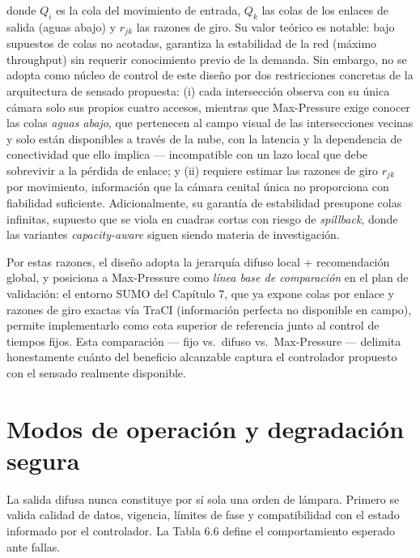 \documentclass[12pt,a4paper,oneside]{report}
\begin{document}
donde \(Q_{i}\) es la cola del movimiento de entrada, \(Q_{k}\) las colas de los enlaces de salida (aguas abajo) y \(r_{jk}\) las razones de giro. Su valor teórico es notable: bajo supuestos de colas no acotadas, garantiza la estabilidad de la red (máximo throughput) sin requerir conocimiento previo de la demanda. Sin embargo, no se adopta como núcleo de control de este diseño por dos restricciones concretas de la arquitectura de sensado propuesta: (i) cada intersección observa con su única cámara solo sus propios cuatro accesos, mientras que Max-Pressure exige conocer las colas \emph{aguas abajo}, que pertenecen al campo visual de las intersecciones vecinas y solo están disponibles a través de la nube, con la latencia y la dependencia de conectividad que ello implica --- incompatible con un lazo local que debe sobrevivir a la pérdida de enlace; y (ii) requiere estimar las razones de giro \(r_{jk}\) por movimiento, información que la cámara cenital única no proporciona con fiabilidad suficiente. Adicionalmente, su garantía de estabilidad presupone colas infinitas, supuesto que se viola en cuadras cortas con riesgo de \emph{spillback}, donde las variantes \emph{capacity-aware} siguen siendo materia de investigación.

Por estas razones, el diseño adopta la jerarquía difuso local + recomendación global, y posiciona a Max-Pressure como \emph{línea base de comparación} en el plan de validación: el entorno SUMO del Capítulo 7, que ya expone colas por enlace y razones de giro exactas vía TraCI (información perfecta no disponible en campo), permite implementarlo como cota superior de referencia junto al control de tiempos fijos. Esta comparación --- fijo vs.\ difuso vs.\ Max-Pressure --- delimita honestamente cuánto del beneficio alcanzable captura el controlador propuesto con el sensado realmente disponible.

\section{Modos de operación y degradación segura}\label{modos-operacion-v2}

La salida difusa nunca constituye por sí sola una orden de lámpara. Primero se valida calidad de datos, vigencia, límites de fase y compatibilidad con el estado informado por el controlador. La Tabla 6.6 define el comportamiento esperado ante fallas.
\end{document}
